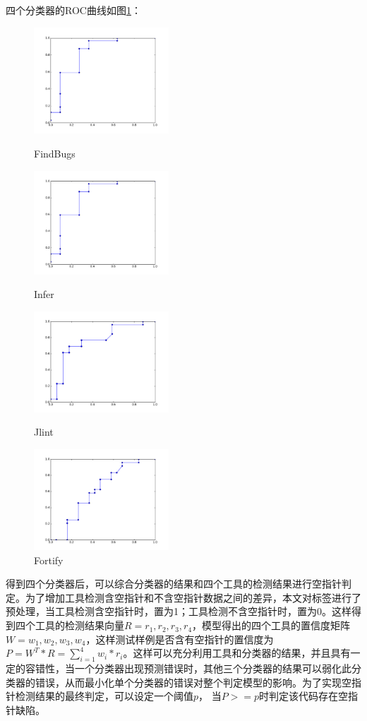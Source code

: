 四个分类器的ROC曲线如图\ref{roc}：
\begin{figure}[ht]
\label{roc}
	\parbox[h]{.5\textwidth}{\centering
		\includegraphics[width=0.45\textwidth]{figures/13.pdf}
		\caption{FindBugs}}
	\parbox[h]{.5\textwidth}{\centering
		\includegraphics[width=0.45\textwidth]{figures/14.pdf}
		\caption{Infer}}
	\parbox[h]{.5\textwidth}{\centering
		\includegraphics[width=0.45\textwidth]{figures/15.pdf}
		\caption{Jlint}}
	\parbox[h]{.5\textwidth}{\centering
		\includegraphics[width=0.45\textwidth]{figures/16.pdf}
		\caption{Fortify}}
\end{figure}


得到四个分类器后，可以综合分类器的结果和四个工具的检测结果进行空指针判定。为了增加工具检测含空指针和不含空指针数据之间的差异，本文对标签进行了预处理，当工具检测含空指针时，置为1；工具检测不含空指针时，置为0。这样得到四个工具的检测结果向量$R={r_1, r_2, r_3, r_4}$，模型得出的四个工具的置信度矩阵$W={w_1, w_2, w_3, w_4}$，这样测试样例是否含有空指针的置信度为$P = W^T*R = \sum_{i=1}^4 w_i*r_i$。这样可以充分利用工具和分类器的结果，并且具有一定的容错性，当一个分类器出现预测错误时，其他三个分类器的结果可以弱化此分类器的错误，从而最小化单个分类器的错误对整个判定模型的影响。为了实现空指针检测结果的最终判定，可以设定一个阈值$p$， 当$P>=p$时判定该代码存在空指针缺陷。

